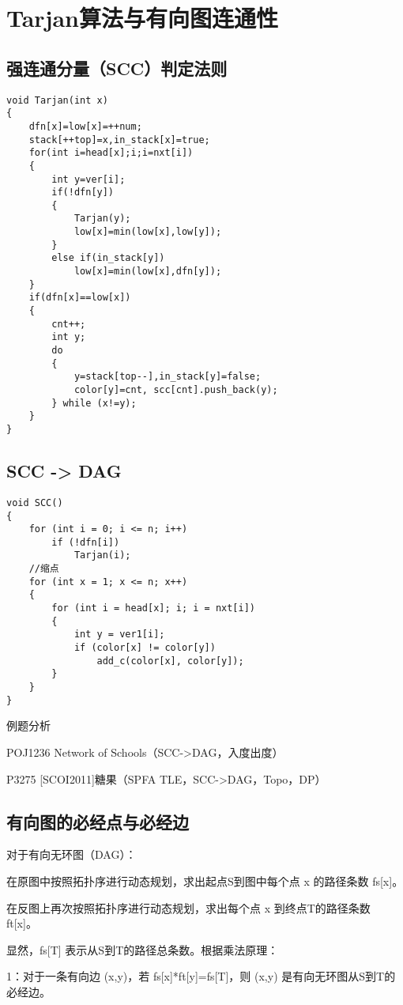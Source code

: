 \section{Tarjan算法与有向图连通性}
\subsection{强连通分量（SCC）判定法则}
\begin{lstlisting}
void Tarjan(int x)
{
    dfn[x]=low[x]=++num;
    stack[++top]=x,in_stack[x]=true;
    for(int i=head[x];i;i=nxt[i])
    {
        int y=ver[i];
        if(!dfn[y])
        {
            Tarjan(y);
            low[x]=min(low[x],low[y]);
        }
        else if(in_stack[y])
            low[x]=min(low[x],dfn[y]);
    }
    if(dfn[x]==low[x])
    {
        cnt++;
        int y;
        do
        {
            y=stack[top--],in_stack[y]=false;
            color[y]=cnt, scc[cnt].push_back(y);
        } while (x!=y);
    }
}
\end{lstlisting}
\subsection{SCC -> DAG}
\begin{lstlisting}
void SCC()
{
    for (int i = 0; i <= n; i++)
        if (!dfn[i])
            Tarjan(i);
    //缩点
    for (int x = 1; x <= n; x++)
    {
        for (int i = head[x]; i; i = nxt[i])
        {
            int y = ver1[i];
            if (color[x] != color[y])
                add_c(color[x], color[y]);
        }
    }
}
\end{lstlisting}
例题分析

POJ1236 Network of Schools（SCC->DAG，入度出度）

P3275 [SCOI2011]糖果（SPFA TLE，SCC->DAG，Topo，DP）

\subsection{有向图的必经点与必经边}
对于有向无环图（DAG）：

    在原图中按照拓扑序进行动态规划，求出起点S到图中每个点 x 的路径条数 fs[x]。

    在反图上再次按照拓扑序进行动态规划，求出每个点 x 到终点T的路径条数 ft[x]。

    显然，fs[T] 表示从S到T的路径总条数。根据乘法原理：

    1：对于一条有向边 (x,y)，若 fs[x]*ft[y]=fs[T]，则 (x,y) 是有向无环图从S到T的必经边。
    
